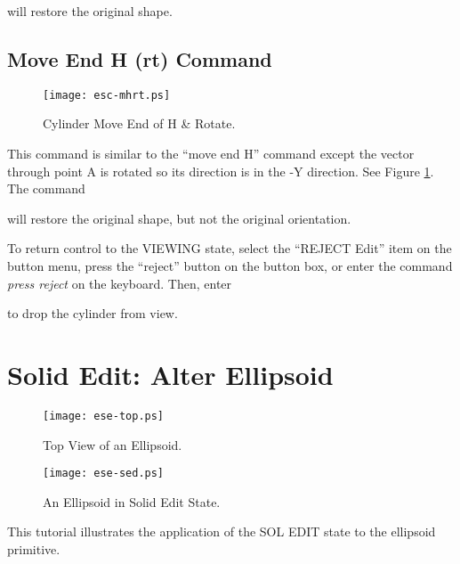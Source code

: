 
will restore the original shape.

\subsection{Move End H (rt) Command}

\begin{figure}
\centering \texttt{[image: esc-mhrt.ps]}
\caption{Cylinder Move End of H \& Rotate.}
\label{esc-mhrt}
\end{figure}


This command is similar to the ``move end H'' command except the vector
through point A is rotated so its direction is in the -Y direction.
See Figure \ref{esc-mhrt}.  The command


will restore the original shape, but not the original orientation.

To return control to the VIEWING state, select the ``REJECT Edit''
item on the button menu, press the ``reject'' button on the button box,
or enter the command {\em press reject} on the keyboard.
Then, enter


to drop the cylinder from view.

\section{Solid Edit: Alter Ellipsoid}

\begin{figure}
\centering \texttt{[image: ese-top.ps]}
\caption{Top View of an Ellipsoid.}
\label{ese-top}
\end{figure}

\begin{figure}
\centering \texttt{[image: ese-sed.ps]}
\caption{An Ellipsoid in Solid Edit State.}
\label{ese-sed}
\end{figure}

This tutorial illustrates the application of the SOL EDIT state to the
ellipsoid primitive.

